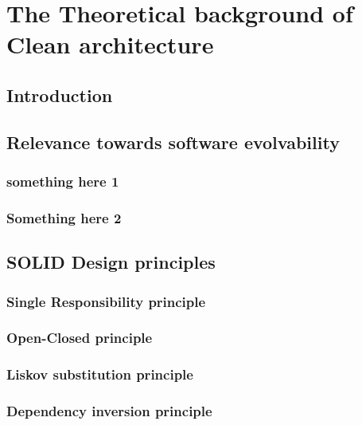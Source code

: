 \section{The Theoretical background of Clean architecture}\label{sec:ca_theory}

\subsection{Introduction}
\lipsum[1-1]
\subsection{Relevance towards software evolvability}
\lipsum[1-1]
\subsubsection{something here 1}
\lipsum[1-1]
\subsubsection{Something here 2}
\lipsum[1-1]
\subsection{SOLID Design principles}
\lipsum[1-1]
\subsubsection{Single Responsibility principle}
\lipsum[1-1]
\subsubsection{Open-Closed principle}
\lipsum[1-1]
\subsubsection{Liskov substitution principle}
\lipsum[1-1]
\subsubsection{Dependency inversion principle}
\lipsum[1-1]